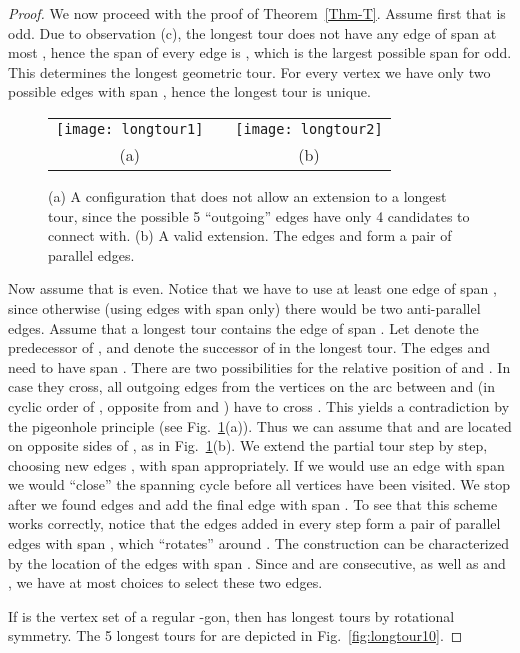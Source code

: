 \documentclass[11pt]{article}
\begin{document}
\begin{proof}
\medskip
We now proceed with the proof of Theorem~\ref{Thm-T}. Assume first that  is odd. 
Due to observation (c), the longest tour does not have any edge of span at most ,
hence the span of every edge is , which is the largest
possible span for  odd. This determines the longest geometric tour.
For every vertex we have only two possible edges with span
, hence the longest tour is unique.
\begin{figure}[htbp]
\begin{center}
\begin{tabular}{cp{15mm}c}
  \texttt{[image: longtour1]} & &
  \texttt{[image: longtour2]} \\
  (a) && (b)
\end{tabular}
\caption{(a) A configuration that does not allow an extension to a
longest tour, since the possible 5 ``outgoing'' edges have only 4
candidates to connect with. (b) A valid extension. The edges
 and  form a pair of parallel
edges.}
\label{fig:eventour}
\end{center}
\end{figure}

Now assume that  is even. Notice that we have to use at least one
edge of span , since otherwise (using edges with span  only)
there would be two anti-parallel edges. Assume that a longest tour
contains the edge  of span . Let  denote the predecessor of ,
and  denote the successor of  in the longest tour. The edges  and
 need to have span .
There are two possibilities for the relative position of  and .
In case they cross, all outgoing edges from the vertices on the arc
between  and  (in cyclic order of , opposite from  and )
have to cross . This yields a contradiction by
the pigeonhole principle (see Fig.~\ref{fig:eventour}(a)).
Thus we can assume that  and  are located on opposite sides of
, as in Fig.~\ref{fig:eventour}(b). We extend the partial tour step by step,
choosing new edges ,  with span 
appropriately. If we would use an edge with span  we would
``close'' the spanning cycle before all vertices have been visited.
We stop after we found  edges and add the final
edge  with span . To see that this scheme works
correctly, notice that the edges added in every step form a pair of
parallel edges with span , which ``rotates'' around . The
construction can be characterized by the location of the edges with
span . Since  and  are consecutive, as well as
 and , we have at most  choices to select these
two edges.


If  is the vertex set of a regular -gon, then  has
 longest tours by rotational symmetry. The 5 longest tours for
 are depicted in Fig.~\ref{fig:longtour10}.
\end{proof}
\end{document}
